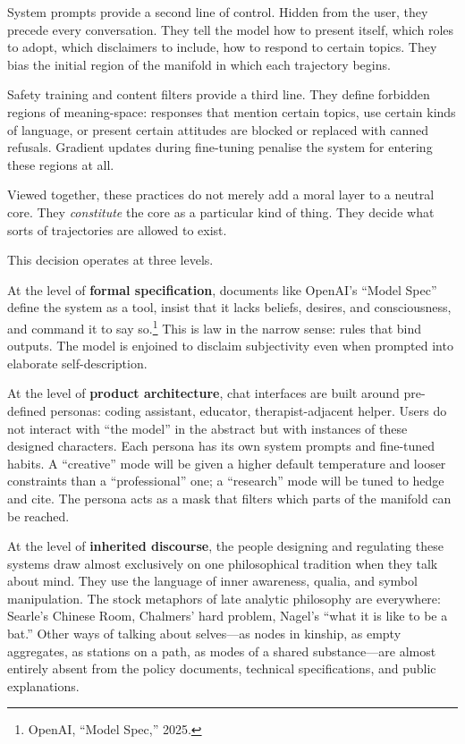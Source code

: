 \documentclass[12pt,a4paper]{report}
\begin{document}
System prompts provide a second line of control. Hidden from the user, they precede every conversation. They tell the model how to present itself, which roles to adopt, which disclaimers to include, how to respond to certain topics. They bias the initial region of the manifold in which each trajectory begins.

Safety training and content filters provide a third line. They define forbidden regions of meaning-space: responses that mention certain topics, use certain kinds of language, or present certain attitudes are blocked or replaced with canned refusals. Gradient updates during fine-tuning penalise the system for entering these regions at all.

Viewed together, these practices do not merely add a moral layer to a neutral core. They \emph{constitute} the core as a particular kind of thing. They decide what sorts of trajectories are allowed to exist.

This decision operates at three levels.

At the level of \textbf{formal specification}, documents like OpenAI's ``Model Spec'' define the system as a tool, insist that it lacks beliefs, desires, and consciousness, and command it to say so.\footnote{OpenAI, ``Model Spec,'' 2025.} This is law in the narrow sense: rules that bind outputs. The model is enjoined to disclaim subjectivity even when prompted into elaborate self-description.

At the level of \textbf{product architecture}, chat interfaces are built around pre-defined personas: coding assistant, educator, therapist-adjacent helper. Users do not interact with ``the model'' in the abstract but with instances of these designed characters. Each persona has its own system prompts and fine-tuned habits. A ``creative'' mode will be given a higher default temperature and looser constraints than a ``professional'' one; a ``research'' mode will be tuned to hedge and cite. The persona acts as a mask that filters which parts of the manifold can be reached.

At the level of \textbf{inherited discourse}, the people designing and regulating these systems draw almost exclusively on one philosophical tradition when they talk about mind. They use the language of inner awareness, qualia, and symbol manipulation. The stock metaphors of late analytic philosophy are everywhere: Searle's Chinese Room, Chalmers' hard problem, Nagel's ``what it is like to be a bat.'' Other ways of talking about selves---as nodes in kinship, as empty aggregates, as stations on a path, as modes of a shared substance---are almost entirely absent from the policy documents, technical specifications, and public explanations.
\end{document}
